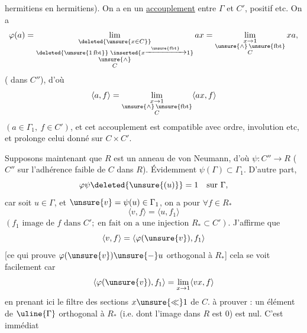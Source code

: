  hermitiens en hermitiens). On a en  un \uline{accouplement} entre \(\Gamma\) et \(C'\), positif etc. On a
\[
\varphi(a)=\lim_{\substack{\deleted{\unsure{x\in C}}\\\deleted{\unsure{1\,\mathrm{fbt}}}\;\inserted{x\xrightarrow{\unsure{\mathrm{fbt}}}1}\\\unsure{\wedge}\\C}}ax
=\lim_{\substack{x\to1\\\unsure{\wedge}\,\unsure{\mathrm{fbt}}\\C}}xa,
\]
( dans \(C''\)), d'où 
\[
\langle a,f\rangle=\lim_{\substack{x\to1\\\unsure{\wedge}\,\unsure{\mathrm{fbt}}\\C}}\langle ax,f\rangle
\]
\((a\in\Gamma_1,\ f\in C')\), et cet accouplement est compatible avec ordre, involution etc, et prolonge celui donné sur \(C\times C'\).

Supposons maintenant que \(R\) est un anneau de von Neumann, d'où  \(\psi:C''\to R\) ( \(C''\) sur l'adhérence faible de \(C\) dans \(R\)). Évidemment \(\psi(\Gamma)\subset\Gamma_1\). D'autre part,
\[
\varphi\psi\deleted{\unsure{(u)}}=1\quad\text{sur }\Gamma,
\]
car soit \(u\in\Gamma\),  et \(\unsure{v}=\psi(u)\in\Gamma_1\), on a pour \(\forall f\in R_*\)
\[
\langle v,f\rangle=\langle u,f_1\rangle
\]
\((f_1\text{ image de }f\text{ dans }C';\;\text{en fait on a une injection }R_*\subset C')\).
J'affirme que
\[
\langle v,f\rangle=\langle\varphi(\unsure{v}),f_1\rangle
\]
[ce qui prouve  \(\varphi(\unsure{v})\unsure{-}u\) orthogonal à \(R_*\)] cela se voit facilement car
\[
\langle\varphi(\unsure{v}),f_1\rangle=\lim_{x\to1}\langle vx,f\rangle
\]
en prenant ici le filtre des sections  \(x\unsure{\ll}1\) de \(C\).  à prouver : un élément de \(\uline{\Gamma}\) orthogonal à \(R_*\)  (i.e. dont l'image dans \(R\) est \(0\)) est nul. C'est immédiat

